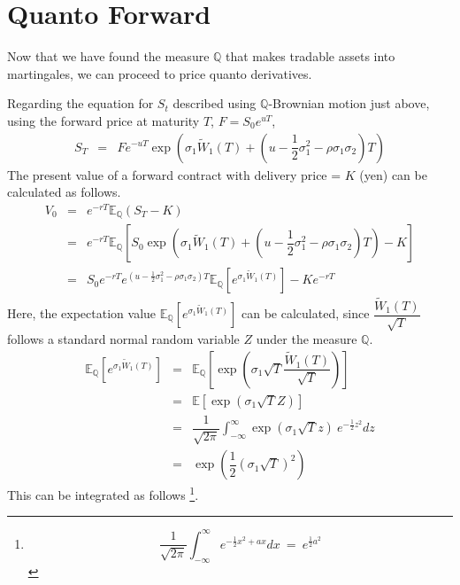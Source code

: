 \documentclass[uplatex,a4j,12pt,dvipdfmx]{jsarticle}
\begin{document}
\section{Quanto Forward}

Now that we have found the measure $\mathbb{Q}$ that makes tradable assets into martingales, we can proceed to price quanto derivatives.

Regarding the equation for $S_t$ described using $\mathbb{Q}$-Brownian motion just above, using the forward price at maturity $T$, $F = S_{0} e^{uT}$,
%
%
\begin{eqnarray*}
	S_{T}
	&=&
	F e^{-uT}
	\exp \left( \sigma_{1} \tilde{W}_{1}(T) +
	\left(
		u - \dfrac{1}{2} \sigma_{1}^{2} - \rho \sigma_{1} \sigma_{2}
		\right)
	T \right)
\end{eqnarray*}
%
%
The present value of a forward contract with delivery price = $K$ (yen) can be calculated as follows.
%
%
\begin{eqnarray*}
	V_{0}
	&=&
	e^{-rT}
	\mathbb{E}_{\mathbb{Q}}(S_{T}-K)
	\\ &=&
	e^{-rT}
	\mathbb{E}_{\mathbb{Q}}
	\left[
		S_{0}
		\exp \left( \sigma_{1} \tilde{W}_{1}(T) +
		\left(
			u - \dfrac{1}{2} \sigma_{1}^{2} - \rho \sigma_{1} \sigma_{2}
			\right)
		T \right)
		-
		K
		\right]
	\\ &=&
	S_{0}
	e^{-rT}
	e^{ (u - \frac{1}{2} \sigma_{1}^{2} - \rho \sigma_{1} \sigma_{2}) T}
	\mathbb{E}_{\mathbb{Q}}
		[e^{\sigma_{1} \tilde{W}_{1}(T)}]
	-
	Ke^{-rT}
\end{eqnarray*}
%
%
Here, the expectation value $\mathbb{E}_{\mathbb{Q}}[e^{\sigma_{1} \tilde{W}_{1}(T)}]$ can be calculated, since $\dfrac{\tilde{W}_{1}(T)}{\sqrt{T}}$ follows a standard normal random variable $Z$ under the measure $\mathbb{Q}$.
%
%
\begin{eqnarray*}
	\mathbb{E}_{\mathbb{Q}}
		[e^{\sigma_{1} \tilde{W}_{1}(T)}]
	&=&
	\mathbb{E}_{\mathbb{Q}}
	\left[ \exp \left( \sigma_{1} \sqrt{T} \dfrac{\tilde{W}_{1}(T)}{\sqrt{T}} \right) \right]
	\\ &=&
	\mathbb{E}
	\left[ \exp \left( \sigma_{1} \sqrt{T} Z \right) \right]
	\\ &=&
	\dfrac{1}{ \sqrt{2 \pi} }
	\int^{\infty}_{-\infty}
	\exp \left( \sigma_{1} \sqrt{T} z \right)
	\
	e^{-\frac{1}{2}z^{2}}
	dz
	\\ &=&
	\exp \left( \dfrac{1}{2} (\sigma_{1} \sqrt{T})^{2} \right)
\end{eqnarray*}
%
%
This can be integrated as follows
\footnote{
	$$
		\dfrac{1}{ \sqrt{2 \pi} }
		\int^{\infty}_{-\infty}
		e^{-\frac{1}{2} x^{2} + ax}
		dx
		\ = \
		e^{\frac{1}{2} a^{2}}
	$$
}.
\end{document}

